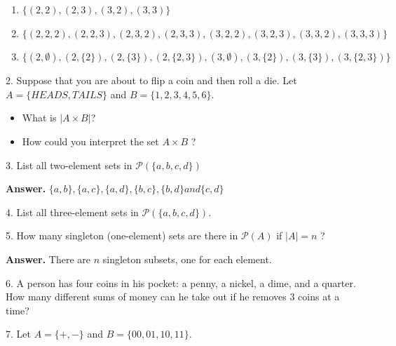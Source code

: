 \documentclass[10pt,]{book}
\theoremstyle{plain}
\theoremstyle{definition}
\theoremstyle{definition}
\theoremstyle{definition}
\theoremstyle{definition}
\begin{document}
\begin{exercisegroup}
\begin{enumerate}[label=\alph*]
\item\hypertarget{li-152}{}\(\{(2, 2), (2, 3), (3, 2), (3, 3)\}\)%
\item\hypertarget{li-153}{} \(\{(2, 2, 2), (2, 2, 3), (2, 3, 2), (2, 3, 3), (3, 2, 2), (3, 2, 3), (3, 3, 2), (3, 3, 3)\}\)%
\item\hypertarget{li-154}{} \(\{(2, \emptyset ), (2, \{2\}), (2, \{3\}), (2, \{2, 3\}), (3, \emptyset ), (3, \{2\}), (3, \{3\}), (3, \{2, 3\})\}\)%
\end{enumerate}
%
\item[2.]\hypertarget{exercise-16}{} 
Suppose that you are about to flip a coin and then roll a die. Let \(A = \{HEADS, TAILS\}\) and  \(B = \{1, 2, 3, 4, 5, 6\}\). %
\par
\leavevmode%
\begin{itemize}[label=\textbullet]
\item{}  What is \(|A \times  B|\)? %
\item{}  How could you interpret the set \(A \times  B\) ?   %
\end{itemize}
%
\par\smallskip
\item[3.]\hypertarget{exercise-17}{} 
List all two-element sets in \(\mathcal{P}(\{a,b,c,d\})\) %
\par\smallskip
\par\smallskip
\noindent\textbf{Answer.}\hypertarget{answer-9}{}\quad
\(\{a, b\}, \{a, c\}, \{a, d\}, \{b, c\}, \{b, d\} and \{c, d\}\)%
\item[4.]\hypertarget{exercise-18}{}
List all three-element sets in \(\mathcal{P}(\{a, b, c,d\})\).%
\par\smallskip
\item[5.]\hypertarget{exercise-19}{}How many singleton (one-element) sets are there in \(\mathcal{P}(A)\) if \(\lvert A \rvert =n\) ? %
\par\smallskip
\par\smallskip
\noindent\textbf{Answer.}\hypertarget{answer-10}{}\quad
 There are \(n\) singleton subsets, one for each element.%
\item[6.]\hypertarget{exercise-20}{}A person has four coins in his pocket: a penny, a nickel, a dime, and a quarter. How many different sums of money can he take out if he removes 3 coins at a time? %
\par\smallskip
\item[7.]\hypertarget{exercise-21}{}Let \(A = \{+,-\}\) and \(B = \{00, 01, 10, 11\}\).%
\par
\leavevmode%
\begin{itemize}[label=\textbullet]

\end{itemize}
\end{exercisegroup}
\end{document}
